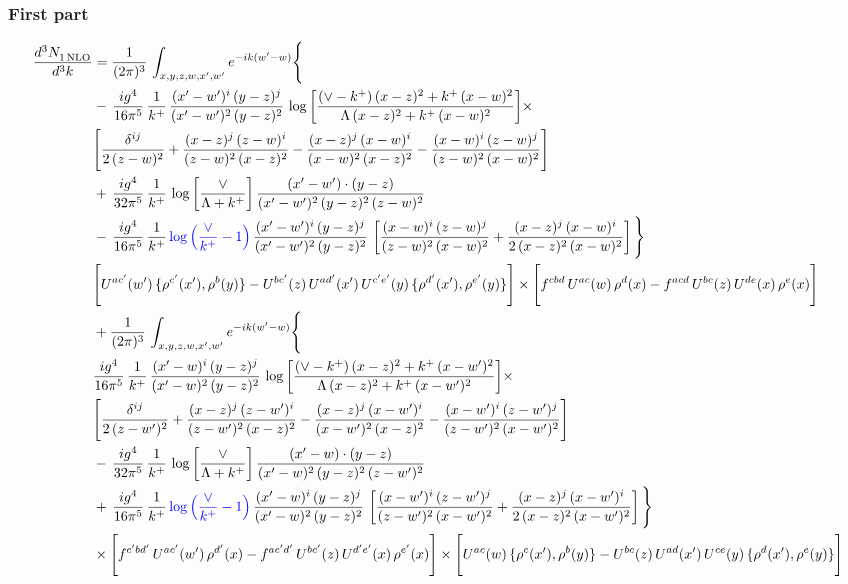 \documentclass[9pt]{article}
\numberwithin{equation}{section}
\begin{document}
\subsubsection{First part}
\begin{align}
 \frac{d^{3}N_{1\,\rm NLO}^{\rm}}{d^{3}k}  & =    \frac{1}{(2\pi)^{3}}\,\int_{x,y,z,w,x',w^{\prime}} e^{-ik(w^{\prime}-w)}\Bigg\{ \notag \\ & -\, \frac{ig^{4}}{16\pi^{5}}\,\frac{1}{k^{+}}\, \frac{(x'-w')^{i}\,(y-z)^{j}}{(x'-w')^{2}\,(y-z)^{2}}\,\log{\left[\frac{(\vee-k^{+})\,(x-z)^{2}+k^{+}\,(x-w)^{2}}{\Lambda\, (x-z)^{2}+k^{+}\,(x-w)^{2}}\right]}\times\notag \\ &  \Bigg[\frac{\delta^{ij}}{2\,(z-w)^{2}}+\frac{(x-z)^{j}\,(z-w)^{i}}{(z-w)^{2}\,(x-z)^{2}}-\frac{(x-z)^{j}\,(x-w)^{i}}{(x-w)^{2}\,(x-z)^{2}}-\frac{(x-w)^{i}\,(z-w)^{j}}{(z-w)^{2}\,(x-w)^{2}}\Bigg]\notag \\ & +\,\frac{ig^{4}}{32\pi^{5}}\,\frac{1}{k^{+}}\,\log{\left[\frac{\vee}{\Lambda + k^{+}}\right]}\, \frac{(x'-w')\cdot (y-z)}{(x'-w')^{2}\,(y-z)^{2}\,(z-w)^{2}}\notag \\ & -\, \frac{ig^{4}}{16\pi^{5}}\,\frac{1}{k^{+}}\,{\color{blue}\log{\left(\frac{\vee}{k^{+}}-1\right)}}\,\frac{(x'-w')^{i}\,(y-z)^{j}}{(x'-w')^{2}\,(y-z)^{2}}\,\left[\frac{(x-w)^{i}\,(z-w)^{j}}{(z-w)^{2}\,(x-w)^{2}}+\frac{(x-z)^{j}\,(x-w)^{i}}{2\,(x-z)^{2}\, (x-w)^{2}}\right]\Bigg\} \notag \\ & \Bigg[U^{ac'}(w')\,\{\rho^{c'}(x'),\rho^{b}(y)\}-U^{bc'}(z)\,U^{ad'}(x')\,U^{c'e'}(y)\, \{\rho^{d'}(x'),\rho^{e'}(y)\}\Bigg]\times \Bigg[f^{cbd}\,U^{ac}(w)\,\rho^{d}(x)-f^{acd}\, U^{bc}(z)\,U^{de}(x)\,\rho^{e}(x)\Bigg]\notag \\ & + \frac{1}{(2\pi)^{3}}\,\int_{x,y,z,w,x',w^{\prime}} e^{-ik(w^{\prime}-w)}\Bigg\{ \notag \\ &  \frac{ig^{4}}{16\pi^{5}}\,\frac{1}{k^{+}}\, \frac{(x'-w)^{i}\,(y-z)^{j}}{(x'-w)^{2}\,(y-z)^{2}}\,\log{\left[\frac{(\vee-k^{+})\,(x-z)^{2}+k^{+}\,(x-w')^{2}}{\Lambda\, (x-z)^{2} + k^{+}\,(x-w')^{2}}\right]}\times\notag \\ &  \Bigg[\frac{\delta^{ij}}{2\,(z-w')^{2}}+\frac{(x-z)^{j}\,(z-w')^{i}}{(z-w')^{2}\,(x-z)^{2}}-\frac{(x-z)^{j}\,(x-w')^{i}}{(x-w')^{2}\,(x-z)^{2}}-\frac{(x-w')^{i}\,(z-w')^{j}}{(z-w')^{2}\,(x-w')^{2}}\Bigg]\notag \\ & -\,\frac{ig^{4}}{32\pi^{5}}\,\frac{1}{k^{+}}\,\log{\left[\frac{\vee}{\Lambda + k^{+}}\right]}\, \frac{(x'-w)\cdot (y-z)}{(x'-w)^{2}\,(y-z)^{2}\,(z-w')^{2}}\notag \\ & +\,\frac{ig^{4}}{16\pi^{5}}\,\frac{1}{k^{+}}\,{\color{blue}\log{\left(\frac{\vee}{k^{+}}-1\right)}}\,\frac{(x'-w)^{i}\,(y-z)^{j}}{(x'-w)^{2}\,(y-z)^{2}}\,\left[\frac{(x-w')^{i}\,(z-w')^{j}}{(z-w')^{2}\,(x-w')^{2}}+\frac{(x-z)^{j}\,(x-w')^{i}}{2\,(x-z)^{2}\, (x-w')^{2}}\right] \Bigg\} \notag \\ & \times\Bigg[f^{c'bd'}\,U^{ac'}(w')\,\rho^{d'}(x)-f^{ac'd'}\, U^{bc'}(z)\,U^{d'e'}(x)\,\rho^{e'}(x)\Bigg] \times \Bigg[U^{ac}(w)\,\{\rho^{c}(x'),\rho^{b}(y)\}-U^{bc}(z)\,U^{ad}(x')\,U^{ce}(y)\, \{\rho^{d}(x'),\rho^{e}(y)\}\Bigg]
\end{align}
\end{document}
